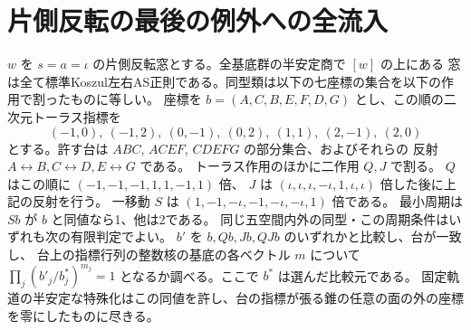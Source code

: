 \section{片側反転の最後の例外への全流入}
\label{sec:mixed-flip-fiber}
\begin{theorem}\label{thm:mixed-flip-fiber}
$w$ を $s=a=\iota$ の片側反転窓とする。全基底群の半安定商で $[w]$ の上にある
窓は全て標準Koszul左右AS正則である。同型類は以下の七座標の集合を以下の作用で割ったものに等しい。
座標を $b=(A,C,B,E,F,D,G)$ とし、この順の二次元トーラス指標を
\[
 (-1,0),\ (-1,2),\ (0,-1),\ (0,2),\ (1,1),\ (2,-1),\ (2,0)
\]
とする。許す台は $ABC$, $AC EF$, $CDEFG$ の部分集合、およびそれらの
反射 $A\leftrightarrow B,C\leftrightarrow D,E\leftrightarrow G$ である。
トーラス作用のほかに二作用 $Q,J$ で割る。
$Q$ はこの順に $(-1,-1,-1,1,1,-1,1)$ 倍、
$J$ は $(\iota,\iota,\iota,-\iota,1,\iota,\iota)$ 倍した後に上記の反射を行う。
一移動 $S$ は $(1,-1,-\iota,-1,-\iota,-\iota,1)$ 倍である。
最小周期は $Sb$ が $b$ と同値なら1、他は2である。
同じ五空間内外の同型・この周期条件はいずれも次の有限判定でよい。
$b'$ を $b,Qb,Jb,QJb$ のいずれかと比較し、台が一致し、
台上の指標行列の整数核の基底の各ベクトル $m$ について $\prod_j(b'_j/b_j^{*})^{m_j}=1$
となるか調べる。ここで $b^{*}$ は選んだ比較元である。
固定軌道の半安定な特殊化はこの同値を許し、台の指標が張る錐の任意の面の外の座標を零にしたものに尽きる。
\end{theorem}
